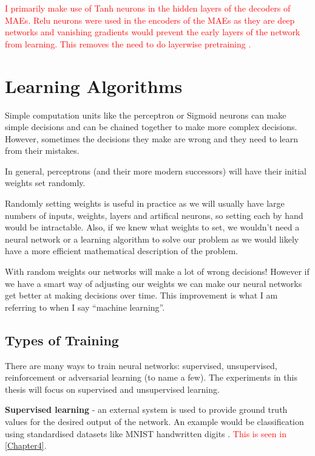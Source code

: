 \textcolor{red}{I primarily make use of \ac{Tanh} neurons in the hidden layers of the decoders of \acp{MAE}.
\ac{Relu} neurons were used in the encoders of the \acp{MAE} as they are deep networks and  vanishing gradients would prevent the early layers of the network from learning. This removes the need to do layerwise pretraining \cite{bengio2007greedy}.}

\section{Learning Algorithms}
Simple computation units like the perceptron or Sigmoid neurons can make simple decisions and can be chained together to make more complex decisions. However, sometimes the decisions they make are wrong and they need to learn from their mistakes.

In general, perceptrons (and their more modern successors) will have their initial weights set randomly. 

Randomly setting weights is useful in practice as we will usually have large numbers of inputs, weights, layers and artifical neurons, so setting each by hand would be intractable. Also, if we knew what weights to set, we wouldn't need a neural network or a learning algorithm to solve our problem as we would likely have a more efficient mathematical description of the problem.

With random weights our networks will make a lot of wrong decisions! However if we have a smart way of adjusting our weights we can make our neural networks get better at making decisions over time. This improvement is what I am referring to when I say ``machine learning''.

\subsection{Types of Training}
There are many ways to train neural networks: supervised, unsupervised, reinforcement or 
adversarial learning (to name a few). The experiments in this thesis will focus on supervised and unsupervised learning. %


\textbf{Supervised learning} - an external system is used to provide ground truth values for the desired output of the network. An example would be classification using standardised datasets like MNIST handwritten digits \cite{lecun1998mnist}. \textcolor{red}{This is seen in \autoref{Chapter4}.}


